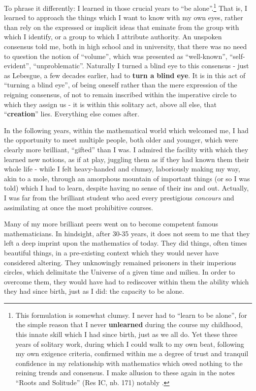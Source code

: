 To phrase it differently: I learned in those crucial years to ``be alone''.\footnote{
This formulation is somewhat clumsy. I never had to ``learn to be alone'', for the simple
reason that I never \textbf{unlearned} during the course my childhood, 
this innate skill which I had since birth, just as we all do. Yet these three years of
solitary work, during which I could walk to my own beat, 
following my own exigence criteria, confirmed within me a degree of trust and tranquil confidence 
in my relationship with mathematics which owed nothing to the reining trends and
consensus. I make allusion to these again in the notes ``Roots and Solitude'' (Res IC, nb.
171) notably 
.
} That is, I learned to approach the things which I want to know with my own eyes, rather
than rely on the expressed or implicit ideas that eminate from the group with which I
identify, or a group to which I attribute authority.
An unspoken consensus told me, both in high school and in university, that there was no
need to question the notion of ``volume'', which was presented as ``well-known'',
``self-evident'', ``unproblematic''.
Naturally I turned a blind eye to this consensus - just as Lebesgue, a few decades
earlier, had to \textbf{turn a blind eye}.
It is in this act of ``turning a blind eye'', of being oneself rather than the mere
expression of the reigning consensus, of not to remain inscribed within the imperative
circle to which they assign us - it is within this solitary act, above all else, that
``\textbf{creation}'' lies. Everything else comes after.

In the following years, within the mathematical world which welcomed me, I had the opportunity 
to meet multiple people, both older and younger, which were clearly more brilliant,
``gifted'' than I was. I admired the facility with which they learned new notions, as if
at play, juggling them as if they had known them their whole life - while I felt
heavy-handed and clumsy, laboriously making my way, akin to a mole, through an amorphous
mountain of important things (or so I was told) which I had to learn, despite having no
sense of their ins and out. Actually, I was far from the brilliant student who aced every prestigious
\emph{concours} and assimilating at once the most prohibitive courses.

Many of my more brilliant peers went on to become competent famous mathematicians. In
hindsight, after 30-35 years, it does not seem to me that they left a deep imprint
upon the mathematics of today. 
They did things, often times beautiful things, in a pre-existing context which they would
never have considered altering.
They unknowingly remained prisoners in their imperious circles, which
delimitate the Universe of 
a given time and milieu. In order to overcome them, they would have had to rediscover
within them the ability which they had since birth, just as I did: the capacity to be
alone. 

